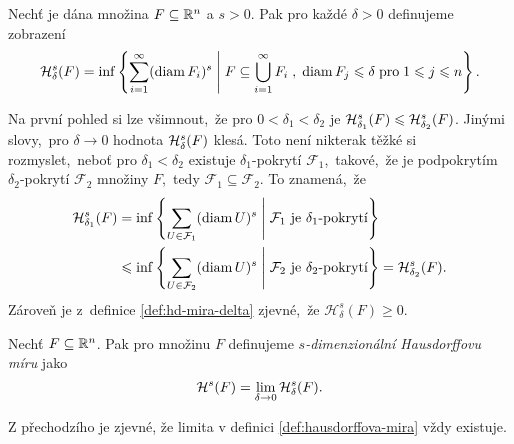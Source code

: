 \begin{definition}\label{def:hd-mira-delta}
    Nechť je dána množina $F\subseteq\R^n$ a $s>0$. Pak pro každé $\delta>0$ definujeme zobrazení
    \[\hausdorffdeltameasure{s}{\delta}(F)=\inf\set{\sum_{i=1}^{\infty}(\diam{F_i})^s\;\middle|\;F\subseteq\bigcup_{i=1}^\infty F_i\;,\;\diam{F_j}\leqslant\delta\;\text{pro}\;1\leqslant j\leqslant n}.\]
\end{definition}
Na první pohled si lze všimnout,~že pro $0<\delta_1<\delta_2$ je $\hausdorffdeltameasure{s}{\delta_1}(F)\leqslant\hausdorffdeltameasure{s}{\delta_2}(F)$. Jinými slovy,~pro $\delta\to 0$ hodnota $\hausdorffdeltameasure{s}{\delta}(F)$ klesá. Toto není nikterak těžké si rozmyslet,~neboť pro $\delta_1<\delta_2$ existuje $\delta_1$-pokrytí $\mathcal{F}_1$,~takové,~že je podpokrytím $\delta_2$-pokrytí $\mathcal{F}_2$ množiny $F$,~tedy $\mathcal{F}_1\subseteq\mathcal{F}_2$. To znamená,~že
\begin{align*}
    \hausdorffdeltameasure{s}{\delta_1}(F)&=\inf\set{\sum_{U\in\mathcal{F}_1}(\diam{U})^s\;\middle|\;\text{$\mathcal{F}_1$ je $\delta_1$-pokrytí}}\\
    &\leqslant\inf\set{\sum_{U\in\mathcal{F}_2}(\diam{U})^s\;\middle|\;\text{$\mathcal{F}_2$ je $\delta_2$-pokrytí}}=\hausdorffdeltameasure{s}{\delta_2}(F).
\end{align*}
Zároveň je z~definice \ref{def:hd-mira-delta} zjevné,~že $\mathcal{H}_\delta^s(F)\geqslant 0$.
\begin{definition}\label{def:hausdorffova-mira}
    Nechť $F\subseteq\R^n$. Pak pro množinu $F$ definujeme \emph{$s$-dimenzionální Hausdorffovu míru} jako
    \[\hausdorffmeasure{s}(F)=\lim_{\delta\to 0}\hausdorffdeltameasure{s}{\delta}(F).\]
\end{definition}
Z přechodzího je zjevné, že limita v definici \ref{def:hausdorffova-mira} vždy existuje.

